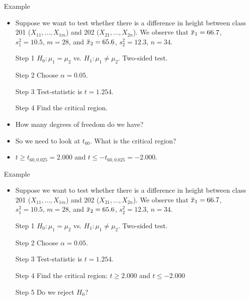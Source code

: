 \documentclass[10pt, handout, xcolor=table]{beamer}
\newcommand{\overbar}[1]{\mkern 1.5mu\overline{\mkern-1.5mu#1\mkern-1.5mu}\mkern 1.5mu}
\begin{document}
\begin{frame}{Example}
\begin{itemize}
\setlength{\itemsep}{8pt}
\item Suppose we want to test whether there is a difference in height between class 201 ($X_{11}, \dots, X_{1m}$)  and 202 ($X_{21}, \dots, X_{2n}$). We observe that $\overbar{x}_1 = 66.7$, $s_1^2 = 10.5$, $m = 28$, and $\overbar{x}_2 = 65.6$, $s_2^2 = 12.3$, $n = 34$. 
\item[Step 1] $H_0: \mu_1 = \mu_2$ vs. $H_1: \mu_1 \neq \mu_2$. Two-sided test.   
\item[Step 2] Choose $\alpha = 0.05$. 
\item[Step 3] Test-statistic is $t = 1.254$.
\item[Step 4] Find the critical region.
\item<2->[] How many degrees of freedom do we have? 
\item<4->[] So we need to look at $t_{60}$. What is the critical region?
\item<5->[] $t \geq t_{60, 0.025} = 2.000$ and $t \leq -t_{60, 0.025} = -2.000$.
\end{itemize}
\end{frame}

\begin{frame}{Example}
\begin{itemize}
\setlength{\itemsep}{12pt}
\item Suppose we want to test whether there is a difference in height between class 201 ($X_{11}, \dots, X_{1m}$)  and 202 ($X_{21}, \dots, X_{2n}$). We observe that $\overbar{x}_1 = 66.7$, $s_1^2 = 10.5$, $m = 28$, and $\overbar{x}_2 = 65.6$, $s_2^2 = 12.3$, $n = 34$. 
\item[Step 1] $H_0: \mu_1 = \mu_2$ vs. $H_1: \mu_1 \neq \mu_2$. Two-sided test.   
\item[Step 2] Choose $\alpha = 0.05$. 
\item[Step 3] Test-statistic is $t = 1.254$.
\item[Step 4] Find the critical region: $t \geq 2.000$ and $t \leq -2.000$
\item[Step 5] Do we reject $H_0$? 
\end{itemize}
\end{frame}
\end{document}
